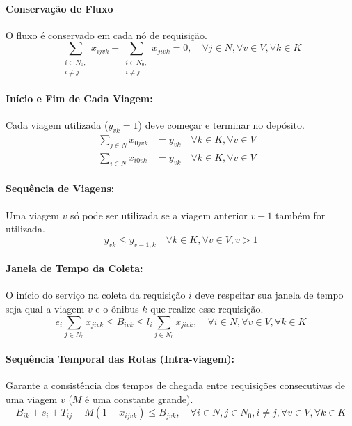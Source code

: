 \documentclass[12pt, a4paper]{article}
\begin{document}
\paragraph{Conservação de Fluxo} O fluxo é conservado em cada nó de requisição.
\begin{equation}
\sum_{\substack{i \in N_0,\\i \neq j}} x_{ijvk} - \sum_{\substack{i \in N_0,\\i \neq j}} x_{jivk} = 0, \quad \forall j \in N, \forall v \in V, \forall k \in K
\end{equation}

\paragraph{Início e Fim de Cada Viagem:} Cada viagem utilizada ($y_{vk} = 1$) deve começar e terminar no depósito.
\begin{align}
\sum_{j \in N} x_{0jvk} &= y_{vk} \quad \forall k \in K, \forall v \in V & \\
\sum_{i \in N} x_{i0vk} &= y_{vk} \quad \forall k \in K, \forall v \in V &
\end{align}

\paragraph{Sequência de Viagens:} Uma viagem $v$ só pode ser utilizada se a viagem anterior $v-1$ também for utilizada.
\begin{equation}
y_{vk} \le y_{v-1, k} \quad \forall k \in K, \forall v \in V, v > 1
\end{equation}

\paragraph{Janela de Tempo da Coleta:} O início do serviço na coleta da requisição $i$ deve respeitar sua janela de tempo seja qual a viagem $v$ e o ônibus $k$ que realize esse requisição.
\begin{equation}
e_i \sum_{j \in N_0} x_{jivk} \le B_{ivk} \le l_i \sum_{j \in N_0} x_{jivk}, \quad \forall i \in N, \forall v \in V, \forall k \in K
\end{equation}

\paragraph{Sequência Temporal das Rotas (Intra-viagem):} Garante a consistência dos tempos de chegada entre requisições consecutivas de uma viagem $v$ ($M$ é uma constante grande).
\begin{equation}
B_{ik} + s_i + T_{ij} - M(1 - x_{ijvk}) \le B_{jvk}, \quad \forall i \in N, j \in N_0, i \neq j, \forall v \in V, \forall k \in K
\end{equation}
\end{document}
